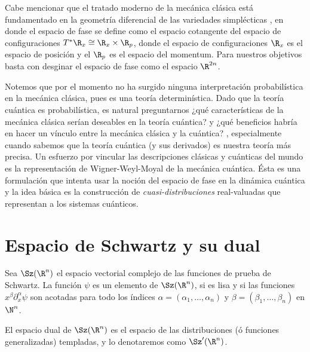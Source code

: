   Cabe mencionar que el tratado moderno de la mecánica
  clásica está fundamentado en la geometría diferencial de
  las variedades simplécticas
  \cite{mcinerneyFirstStepsDifferential2013}, en donde el
  espacio de fase se define como el espacio cotangente del
  espacio de configuraciones $T^{*} \R_x \cong \R_x \times
  \R_p$, donde el espacio de configuraciones  $\R_x$ es el
  espacio de posición y el $\R_p$ es el espacio del
  momentum.  Para nuestros objetivos basta con desginar el
  espacio de fase como el espacio $\R^{2n}$.

  Notemos que por el momento no ha surgido ninguna
  interpretación probabilística en la mecánica clásica, pues
  es una teoría determinística. Dado que la teoría cuántica
  es probabilística, es natural preguntarnos ¿qué
  características de la mecánica clásica serían deseables en
  la teoría cuántica? y ¿qué beneficios habría en hacer un
  vínculo entre la mecánica clásica y la cuántica?
  \cite{schroeckQuantumMechanicsPhase1996}, especialmente
  cuando sabemos que la teoría cuántica (y sus derivados) es
  nuestra teoría más precisa. Un esfuerzo por vincular las
  descripciones clásicas y cuánticas del mundo es la
  representación de Wigner-Weyl-Moyal de la mecánica
  cuántica.  Ésta es una formulación que intenta usar la
  noción del espacio de fase en la dinámica cuántica y la
  idea básica es la construcción de
  \textit{cuasi-distribuciones} real-valuadas que
  representan a los sistemas cuánticos.

  \section{Espacio de Schwartz y su dual}

  \begin{definition}
    Sea $\Sz(\R^{n})$ el espacio vectorial complejo
    de las funciones de prueba de Schwartz. La función
    $\psi$ es un elemento de $\Sz(\R^{n})$, si es
    lisa y si las funciones $x^{\beta} \partial_x^{\alpha}
    \psi$ son acotadas para todo los índices $\alpha =
    (\alpha_1, \ldots, \alpha_n)$ y $\beta = (\beta_1,
    \ldots, \beta_n)$ en $\N^{n}$.
  \end{definition}

  \begin{definition}
    El espacio dual de $\Sz(\R^{n})$ es el espacio de
    las distribuciones (ó funciones generalizadas)
    templadas, y lo denotaremos como $\Sz'(\R^{n})$.
  \end{definition}


